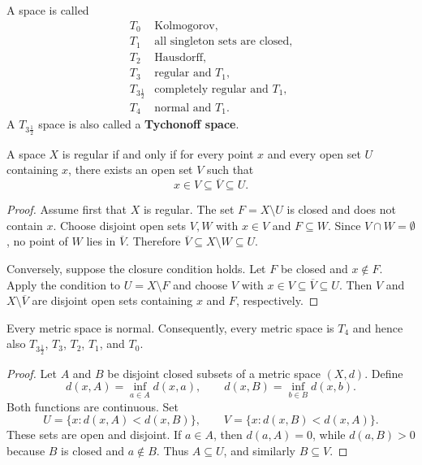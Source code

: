 \begin{definition}
A space is called
\[
\begin{array}{c|l}
T_0 & \text{Kolmogorov},\\
T_1 & \text{all singleton sets are closed},\\
T_2 & \text{Hausdorff},\\
T_3 & \text{regular and }T_1,\\
T_{3\frac12} & \text{completely regular and }T_1,\\
T_4 & \text{normal and }T_1.
\end{array}
\]
A $T_{3\frac12}$ space is also called a \textbf{Tychonoff space}.
\end{definition}

\begin{proposition}
A space $X$ is regular if and only if for every point $x$ and every open set $U$ containing $x$, there exists an open set $V$ such that
\[
    x\in V\subseteq \overline{V}\subseteq U.
\]
\end{proposition}

\begin{proof}
Assume first that $X$ is regular. The set $F=X\setminus U$ is closed and does not contain $x$. Choose disjoint open sets $V,W$ with $x\in V$ and $F\subseteq W$. Since $V\cap W=\emptyset$, no point of $W$ lies in $\overline{V}$. Therefore $\overline{V}\subseteq X\setminus W\subseteq U$.

Conversely, suppose the closure condition holds. Let $F$ be closed and $x\notin F$. Apply the condition to $U=X\setminus F$ and choose $V$ with $x\in V\subseteq\overline{V}\subseteq U$. Then $V$ and $X\setminus\overline{V}$ are disjoint open sets containing $x$ and $F$, respectively.
\end{proof}

\begin{theorem}
Every metric space is normal. Consequently, every metric space is $T_4$ and hence also $T_{3\frac12}$, $T_3$, $T_2$, $T_1$, and $T_0$.
\end{theorem}

\begin{proof}
Let $A$ and $B$ be disjoint closed subsets of a metric space $(X,d)$. Define
\[
    d(x,A)=\inf_{a\in A}d(x,a),\qquad d(x,B)=\inf_{b\in B}d(x,b).
\]
Both functions are continuous. Set
\[
    U=\{x:d(x,A)<d(x,B)\},\qquad
    V=\{x:d(x,B)<d(x,A)\}.
\]
These sets are open and disjoint. If $a\in A$, then $d(a,A)=0$, while $d(a,B)>0$ because $B$ is closed and $a\notin B$. Thus $A\subseteq U$, and similarly $B\subseteq V$.
\end{proof}

